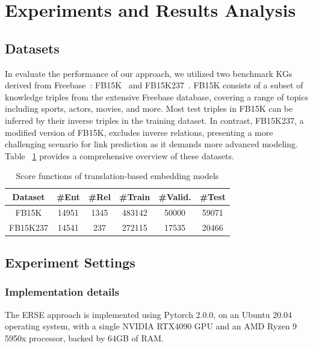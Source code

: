 \documentclass{article}
\begin{document}
\section{Experiments and Results Analysis}
\label{Exper}
\subsection{Datasets}

In evaluate the performance of our approach, we utilized two benchmark KGs derived from Freebase~\cite{10.1145/1376616.1376746}: FB15K~\cite{NIPS2013_1cecc7a7} and FB15K237~\cite{toutanova-chen-2015-observed}. FB15K consists of a subset of knowledge triples from the extensive Freebase database, covering a range of topics including sports, actors, movies, and more. Most test triples in FB15K can be inferred by their inverse triples in the training dataset. In contrast, FB15K237, a modified version of FB15K, excludes inverse relations, presenting a more challenging scenario for link prediction as it demands more advanced modeling. Table ~\ref{tab:datasets} provides a comprehensive overview of these datasets.

\begin{table}[hbtp!]
{
    \centering
    \begin{tabular}{cccccc}
        \toprule
        \textbf{Dataset} & \textbf{\#Ent} & \textbf{\#Rel} & \textbf{\#Train}  & \textbf{\#Valid.} & \textbf{\#Test}\\
        \midrule

        FB15K & 14951 & 1345 & 483142 & 50000 & 59071\\
        FB15K237 & 14541 & 237 & 272115 & 17535 & 20466\\
        
        \bottomrule
    \end{tabular}
    \caption{Score functions of translation-based embedding models}
    \label{tab:datasets}
}
\end{table}

\subsection{Experiment Settings}

\subsubsection{Implementation details}
The ERSE approach is implemented using Pytorch 2.0.0, on an Ubuntu 20.04 operating system, with a single NVIDIA RTX4090 GPU and an AMD Ryzen 9 5950x processor, backed by 64GB of RAM.
\end{document}
